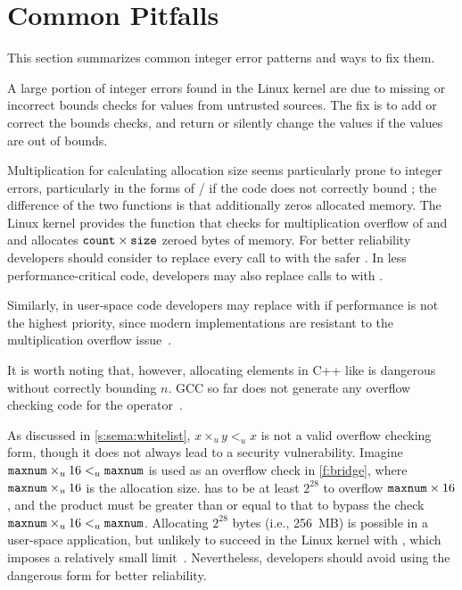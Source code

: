 \section{Common Pitfalls}
\label{s:common}

This section summarizes common integer error patterns and ways
to fix them.

A large portion of integer errors found in the Linux kernel are due
to missing or incorrect bounds checks for values from untrusted sources.
The fix is to add or correct the bounds checks, and return 
or silently change the values if the values are out of bounds.

Multiplication for calculating allocation size seems particularly
prone to integer errors, particularly in the forms of
/ if
the code does not correctly bound ;
the difference of the two functions is that  additionally
zeros allocated memory.
The Linux kernel provides the function
 that checks for multiplication overflow
of  and  and allocates
$\texttt{count}\times\texttt{size}$ zeroed bytes of memory.
For better reliability developers should consider to replace every
call to  with the safer .
In less performance-critical code, developers may also replace calls
to  with .

Similarly, in user-space code developers may replace  with 
if performance is not the highest priority,
since modern  implementations are resistant
to the multiplication overflow issue~\cite{rus-cert:calloc}.

It is worth noting that, however, allocating elements in C++ like  is dangerous without correctly bounding $n$.  GCC so far
does not generate any overflow checking code for the 
operator~\cite{gcc-new}.

As discussed in \autoref{s:sema:whitelist},
$x \times_u y <_u x$ is not a valid overflow checking form,
though it does not always lead to a security vulnerability.
Imagine $\texttt{maxnum} \times_u 16 <_u \texttt{maxnum}$ is used as an
overflow check in \autoref{f:bridge}, where $\texttt{maxnum} \times_u
16$ is the allocation size.
 has to be at least $2^{28}$ to
overflow $\texttt{maxnum} \times 16$, and the product must be greater
than or equal to that to bypass the check $\texttt{maxnum} \times_u 16
<_u \texttt{maxnum}$.  Allocating $2^{28}$ bytes (i.e., 256~MB) is
possible in a user-space application, but unlikely to succeed in
the Linux kernel with , which imposes a relatively small
limit~\cite[\chapterautorefname~8]{ldd3}.
Nevertheless, developers should avoid using the dangerous form for
better reliability.

